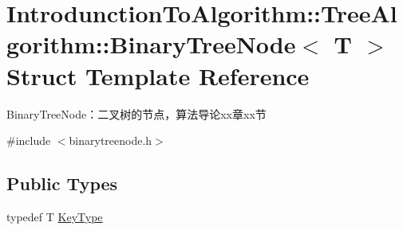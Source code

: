 \hypertarget{struct_introdunction_to_algorithm_1_1_tree_algorithm_1_1_binary_tree_node}{}\section{Introdunction\+To\+Algorithm\+:\+:Tree\+Algorithm\+:\+:Binary\+Tree\+Node$<$ T $>$ Struct Template Reference}
\label{struct_introdunction_to_algorithm_1_1_tree_algorithm_1_1_binary_tree_node}


Binary\+Tree\+Node：二叉树的节点，算法导论xx章xx节  




{\ttfamily \#include $<$binarytreenode.\+h$>$}

\subsection*{Public Types}
\begin{DoxyCompactItemize}
\item 
typedef T \hyperlink{struct_introdunction_to_algorithm_1_1_tree_algorithm_1_1_binary_tree_node_a0967a0c85792f7b02a005eb1942d1bf5}{Key\+Type}
\end{DoxyCompactItemize}
